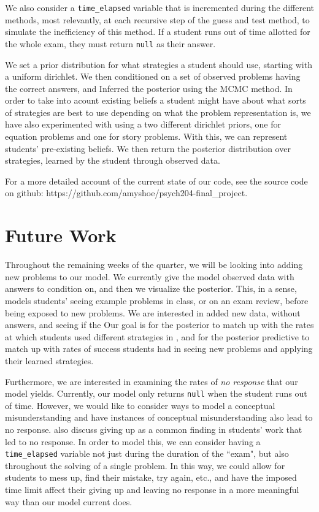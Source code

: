 \documentclass[10pt,letterpaper]{article}
\newcommand\TODO[1]{\textcolor{red}{#1}}
\begin{document}
	We also consider a \verb|time_elapsed| variable that is incremented during the different methods, most relevantly, at each recursive step of the guess and test method, to simulate the inefficiency of this method. If a student runs out of time allotted for the whole exam, they must return \verb|null| as their answer.
	
	We set a prior distribution for what strategies a student should use, starting with a uniform dirichlet. We then conditioned on a set of observed problems having the correct answers, and Inferred the posterior using the MCMC method. In order to take into acount existing beliefs a student might have about what sorts of strategies are best to use depending on what the problem representation is, we have also experimented with using a two different dirichlet priors, one for equation problems and one for story problems. With this, we can represent students' pre-existing beliefs. We then return the posterior distribution over strategies, learned by the student through observed data.
	
	For a more detailed account of the current state of our code, see the source code on github: https://github.com/amyshoe/psych204-final\_project.
	
	
	\section{Future Work}
	Throughout the remaining weeks of the quarter, we will be looking into adding new problems to our model. We currently give the model observed data with answers to condition on, and then we visualize the posterior. This, in a sense, models students' seeing example problems in class, or on an exam review, before being exposed to new problems. We are interested in added new data, without answers, and seeing if the 
	Our goal is for the posterior to match up with the rates at which students used different strategies in \cite{KoedNath2004, 2008}, and for the posterior predictive to match up with rates of success students had in seeing new problems and applying their learned strategies. 
	
	Furthermore, we are interested in examining the rates of \textit{no response} that our model yields. Currently, our model only returns \verb|null| when the student runs out of time. However, we would like to consider ways to model a conceptual misunderstanding and have instances of conceptual misunderstanding also lead to no response.  also discuss giving up as a common finding in students' work that led to no response. In order to model this, we can consider having a \verb|time_elapsed| variable not just during the duration of the ``exam", but also throughout the solving of a single problem. In this way, we could allow for students to mess up, find their mistake, try again, etc., and have the imposed time limit affect their giving up and leaving no response in a more meaningful way than our model current does.
	
\end{document}

